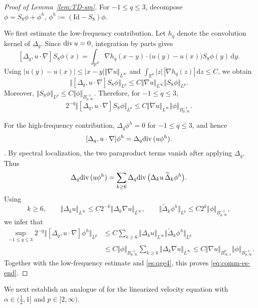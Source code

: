 \documentclass[reqno,11pt,a4paper]{amsart}
\newcommand{\R}{\ensuremath{\mathbb{R}}}
\newcommand{\dd}{\mathrm{d}}
\renewcommand{\div}{{\rm div\,}}
\begin{document}
\begin{proof}[Proof of Lemma~\ref{lem:TD-sm}]
For $-1\leq q\leq3$, decompose $\phi=S_8\phi+\phi^h,\,\phi^h:=(\mathrm{Id}-S_8)\phi$.

We first estimate the low-frequency contribution.
Let $h_q$ denote the convolution kernel of $\Delta_q$.
Since $\div u=0$, integration by parts gives
\[
  [\Delta_q,u\cdot\nabla]S_8\phi(x)
  =
  \int_{\R^d}
  \nabla h_q(x-y)\cdot
  \bigl(u(y)-u(x)\bigr)S_8\phi(y)\,\dd y.
\]
Using
$|u(y)-u(x)|\leq |x-y|\Vert \nabla u\Vert _{L^\infty}$ and $\int_{\R^d}|z|\,|\nabla h_q(z)|\,\dd z\leq C$,
we obtain
\[
  \Vert [\Delta_q,u\cdot\nabla]S_8\phi\Vert _{L^p}
  \leq
  C\Vert \nabla u\Vert _{L^\infty}\Vert S_8\phi\Vert _{L^p}.
\]
Moreover,
$\Vert S_8\phi\Vert _{L^p}
  \leq  C\Vert \phi\Vert _{B^{-1}_{p,\infty}}$.
Therefore, for $-1\leq q\leq3$,
\[
  2^{-q}\Vert [\Delta_q,u\cdot\nabla]S_8\phi\Vert _{L^p}
  \leq
  C\Vert \nabla u\Vert _{L^\infty}
  \Vert \phi\Vert _{B^{-1}_{p,\infty}}.
\]

For the high-frequency contribution,
$\Delta_q\phi^h=0$ for $-1\leq q\leq 3$, and hence
$$[\Delta_q,u\cdot\nabla]\phi^h = \Delta_q\div(u\phi^h).$$.
By spectral localization, the two paraproduct terms
vanish after applying $\Delta_q$. Thus
\[
  \Delta_q\div(u\phi^h)
  =
  \sum_{k\geq6}
  \Delta_q\div
  \bigl(\Delta_ku\,\widetilde\Delta_k\phi^h\bigr).
\]
Using
\[
  k\geq 6,\qquad\Vert \Delta_ku\Vert _{L^\infty}
  \leq C2^{-k}\Vert \Delta_k\nabla u\Vert _{L^\infty},
  \qquad
  \Vert \widetilde\Delta_k\phi^h\Vert _{L^p}
  \leq C2^k\Vert \phi\Vert _{B^{-1}_{p,\infty}},
\]
we infer that
\begin{align*}
  \sup_{-1\leq q\leq 3} 2^{-q}\Vert [\Delta_q,u\cdot\nabla]\phi^h\Vert _{L^p}
  & \leq
  C\sum_{k\geq6}
  \Vert \Delta_ku\Vert _{L^\infty}
  \Vert \widetilde\Delta_k\phi^h\Vert _{L^p} \\
  & \leq
  C\Vert \phi\Vert _{B^{-1}_{p,\infty}}
  \sum_{k\geq6}\Vert \Delta_k\nabla u\Vert _{L^\infty}
  \leq
  C\Vert \nabla u\Vert _{B^0_{\infty,1}}
  \Vert \phi\Vert _{B^{-1}_{p,\infty}}.
\end{align*}
Together with the low-frequency estimate
and \eqref{es:qge4}, this proves
\eqref{eq:comm-es-end}.
\end{proof}

We next establish an analogue of
\cite[Proposition~4.3]{HKR10}
for the linearized velocity equation with
$\alpha\in(\tfrac12,1]$ and $p\in[2,\infty)$.
\end{document}
